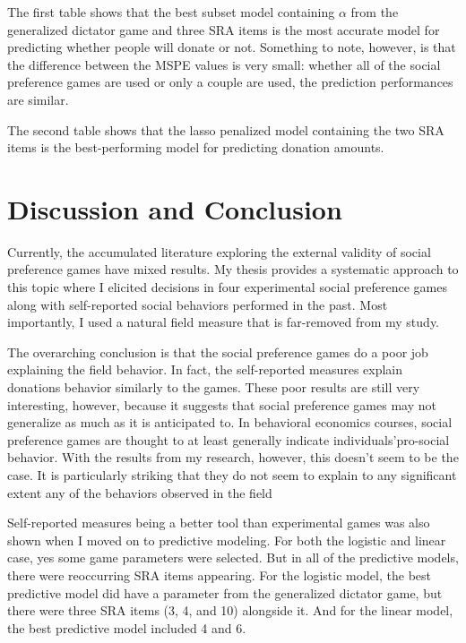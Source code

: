 \documentclass[12pt]{article}
\begin{document}
The first table shows that the best subset model containing \(\alpha\) from the generalized dictator game and three SRA items is the most accurate model for predicting whether people will donate or not. Something to note, however, is that the difference between the MSPE values is very small: whether all of the social preference games are used or only a couple are used, the prediction performances are similar.

The second table shows that the lasso penalized model containing the two SRA items is the best-performing model for predicting donation amounts.

\section{Discussion and Conclusion}

Currently, the accumulated literature exploring the external validity of social preference games have mixed results. My thesis provides a systematic approach to this topic where I elicited decisions in four experimental social preference games along with self-reported social behaviors performed in the past. Most importantly, I used a natural field measure that is far-removed from my study.

The overarching conclusion is that the social preference games do a poor job explaining the field behavior. In fact, the self-reported measures explain donations behavior similarly to the games. These poor results are still very interesting, however, because it suggests that social preference games may not generalize as much as it is anticipated to. {\color{red} In behavioral economics courses, social preference games are thought to at least generally indicate individuals\rq pro-social behavior. With the results from my research, however, this doesn\rq t seem to be the case.}  It is particularly striking that they do not seem to explain to any significant extent any of the behaviors observed in the field

Self-reported measures being a better tool than experimental games was also shown when I moved on to predictive modeling. For both the logistic and linear case, yes some game parameters were selected. But in all of the predictive models, there were reoccurring SRA items appearing. For the logistic model, the best predictive model did have a parameter from the generalized dictator game, but there were three SRA items (3, 4, and 10) alongside it. And for the linear model, the best predictive model included 4 and 6.
\end{document}
